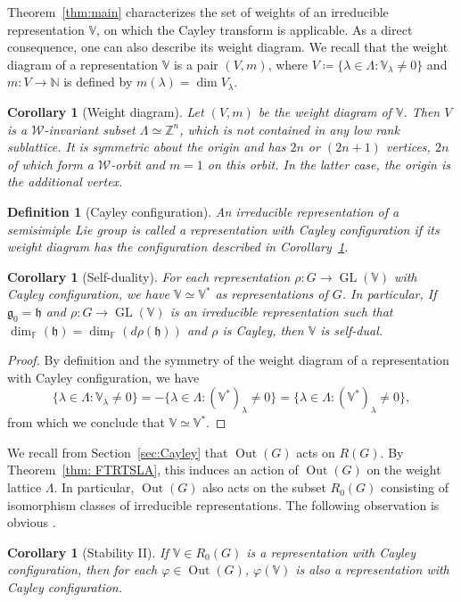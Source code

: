 \documentclass[11pt,reqno]{amsart}
\DeclareMathOperator{\GL}{GL}
\DeclareMathOperator{\Out}{Out}
\newtheorem{corollary}[theorem]{Corollary}
\newtheorem{definition}[theorem]{Definition}
\newcommand{\FF}{\mathbb{F}} %
\newcommand{\W}{\mathcal{W}}
\begin{document}
Theorem~\ref{thm:main} characterizes the set of weights of an irreducible representation $\mathbb{V}$,  on which the Cayley transform is applicable.  As a direct consequence,  one can also describe its weight diagram.  We recall that the weight diagram of a representation $\mathbb{V}$ is a pair $(V,  m)$,  where $V \coloneqq \{\lambda \in \Lambda: \mathbb{V}_{\lambda} \ne 0\}$ and $m: V \to \mathbb{N}$ is defined by $m(\lambda) = \dim V_{\lambda}$.
\begin{corollary}[Weight diagram]\label{rmk:polytope}
{Let $(V,m)$ be the weight diagram of $\mathbb{V}$.  Then $V$ is a $\W$-invariant subset $\Lambda \simeq \mathbb{Z}^n$,  which is not contained in any low rank sublattice.  It is symmetric about the origin and has $2n$ or $(2n+1)$ vertices,  $2n$ of which form a $\W$-orbit and $m = 1$ on this orbit.  In the latter case,  the origin is the additional vertex. }
\end{corollary}
\begin{definition}[Cayley configuration]
An irreducible representation of a semisimiple Lie group is called a representation with Cayley configuration if its weight diagram has the configuration described in Corollary~\ref{rmk:polytope}.
\end{definition}

\begin{corollary}[Self-duality]
For each representation $\rho: G \to \GL(\mathbb{V})$ with Cayley configuration,  we have $\mathbb{V} \simeq \mathbb{V}^\ast$ as representations of $G$.  In particular,  If $\mathfrak{g}_0 = \mathfrak{h}$ and $\rho: G \to \GL(\mathbb{V})$ is an  irreducible representation such that $\dim_\FF(\mathfrak{h}) = \dim_\FF(d \rho (\mathfrak{h}))$ and  $\rho$ is Cayley,  then $\mathbb{V}$ is self-dual.
\end{corollary}
\begin{proof}
By definition and the symmetry of the weight diagram of a representation with Cayley configuration,  we have 
\[
\{\lambda\in \Lambda: \mathbb{V}_{\lambda} \ne 0 \} = -\{\lambda\in \Lambda: (\mathbb{V}^\ast)_{\lambda} \ne 0 \} = \{\lambda\in \Lambda: (\mathbb{V}^\ast)_{\lambda} \ne 0 \},
\]
from which we conclude that $\mathbb{V} \simeq \mathbb{V}^\ast$.
\end{proof}



We recall from Section~\ref{sec:Cayley} that $\Out(G)$ acts on $R(G)$.  By Theorem~\ref{thm: FTRTSLA},  this induces an action of $\Out(G)$ on the weight lattice $\Lambda$.  In particular,  $\Out(G)$ also acts on the subset $R_0(G)$ consisting of isomorphism classes of irreducible representations.  The following observation is obvious .
\begin{corollary}[Stability II]
If $\mathbb{V} \in R_0(G)$ is a representation with Cayley configuration,  then for each $\varphi \in \Out(G)$,  $\varphi (\mathbb{V})$ is also a representation with Cayley configuration.
\end{corollary}
\end{document}
